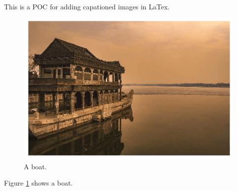 \documentclass{article}
\begin{document}
\paragraph{}
This is a POC for adding capationed images in LaTex.


\begin{figure}[h!]
    \includegraphics[width=\linewidth]{boat.png}
    \caption[boat]{A boat.}
    \label{fig:boat1}
\end{figure}

Figure \ref{fig:boat1} shows a boat.
\end{document}
